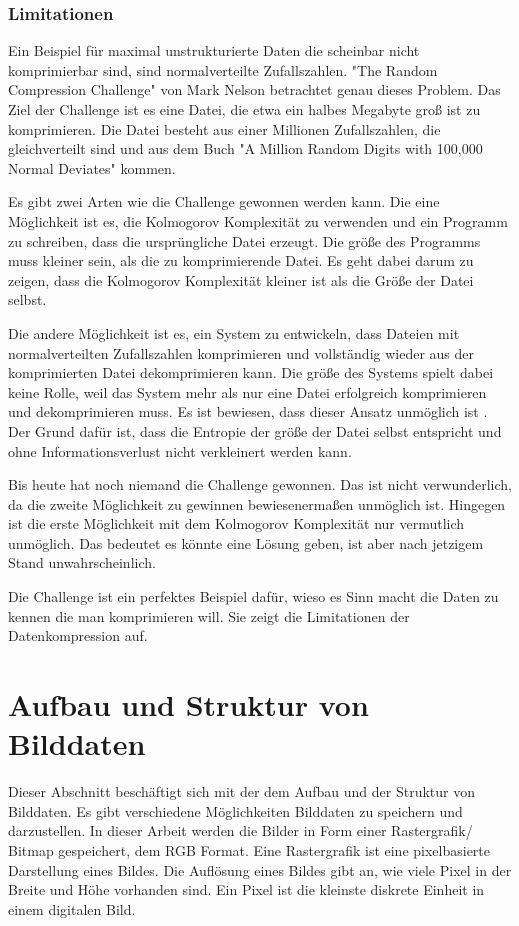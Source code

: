 \documentclass[conference]{IEEEtran}
\begin{document}
\subsubsection{Limitationen}

Ein Beispiel für maximal unstrukturierte Daten die scheinbar nicht komprimierbar
sind, sind normalverteilte Zufallszahlen.
"The Random Compression Challenge" von Mark Nelson \cite{nelson} betrachtet genau dieses
Problem.
Das Ziel der Challenge ist es eine Datei, die etwa ein halbes Megabyte groß ist
zu komprimieren.
Die Datei besteht aus einer Millionen Zufallszahlen, die gleichverteilt sind und
aus dem Buch "A Million Random Digits with 100,000 Normal Deviates" \cite{amilli}
kommen.

Es gibt zwei Arten wie die Challenge gewonnen werden kann.
Die eine Möglichkeit ist es, die Kolmogorov Komplexität zu verwenden und ein
Programm zu schreiben, dass die ursprüngliche Datei erzeugt.
Die größe des Programms muss kleiner sein, als die zu komprimierende Datei.
Es geht dabei darum zu zeigen, dass die Kolmogorov Komplexität kleiner ist
als die Größe der Datei selbst.

Die andere Möglichkeit ist es, ein System zu entwickeln, dass Dateien mit normalverteilten
Zufallszahlen komprimieren und vollständig wieder aus der komprimierten Datei
dekomprimieren kann.
Die größe des Systems spielt dabei keine Rolle, weil das System mehr als nur eine
Datei erfolgreich komprimieren und dekomprimieren muss.
Es ist bewiesen, dass dieser Ansatz unmöglich ist \cite{nelson}.
Der Grund dafür ist, dass die Entropie der größe der Datei selbst entspricht und
ohne Informationsverlust nicht verkleinert werden kann.

Bis heute hat noch niemand die Challenge gewonnen.
Das ist nicht verwunderlich, da
die zweite Möglichkeit zu gewinnen bewiesenermaßen unmöglich ist.
Hingegen ist die erste Möglichkeit mit dem Kolmogorov Komplexität nur
vermutlich unmöglich.
Das bedeutet es könnte eine Lösung geben, ist aber nach jetzigem Stand unwahrscheinlich.

Die Challenge ist ein perfektes Beispiel dafür, wieso es Sinn macht die Daten zu
kennen die man komprimieren will.
Sie zeigt die Limitationen der Datenkompression auf.


\section{Aufbau und Struktur von Bilddaten}

Dieser Abschnitt beschäftigt sich mit der dem Aufbau und der Struktur von Bilddaten.
Es gibt verschiedene Möglichkeiten Bilddaten zu speichern und darzustellen.
In dieser Arbeit werden die Bilder in Form einer Rastergrafik/ Bitmap gespeichert, dem
RGB Format.
Eine Rastergrafik ist eine pixelbasierte Darstellung eines Bildes.
Die Auflösung eines Bildes gibt an, wie viele Pixel in der Breite und Höhe vorhanden sind.
Ein Pixel ist die kleinste diskrete Einheit in einem digitalen Bild.
\end{document}

